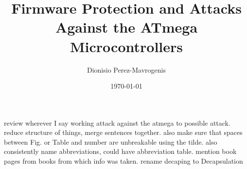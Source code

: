 \documentclass[10pt,journal,compsoc, a4paper]{IEEEtran}
\author{Dionisio Perez-Mavrogenis}
\title{Firmware Protection and Attacks Against the ATmega Microcontrollers}
\date{\today}
\newcommand{\red}[1]{{\color{red} #1}}
\begin{document}
\maketitle
\IEEEdisplaynotcompsoctitleabstractindextext

\red{review wherever I say working attack against the atmega to possible attack. reduce structure of things, merge sentences together. also make sure that spaces between Fig. or Table and number are unbreakable using the tilde. also consistently name abbreviations, could have abbreviation table. mention book pages from books from which info was taken. rename decaping to Decapsulation }


	



	

{\footnotesize 	} %
\end{document}
